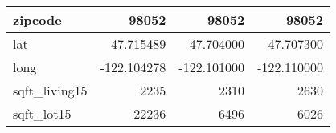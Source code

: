 \begin{table}[H]
\begin{tabular}{|l|r|r|r|}
\hline zipcode & \cellcolor[rgb]{0.9, 0.54, 0.52} 98052 & \cellcolor[rgb]{0.9, 0.54, 0.52} 98052 & \cellcolor[rgb]{0.9, 0.54, 0.52} 98052 \\
\hline lat & \cellcolor[rgb]{0.9, 0.54, 0.52} 47.715489 & 47.704000 & 47.707300 \\
\hline long & \cellcolor[rgb]{0.9, 0.54, 0.52} -122.104278 & \cellcolor[rgb]{0.9, 0.54, 0.52} -122.101000 & \cellcolor[rgb]{0.9, 0.54, 0.52} -122.110000 \\
\hline sqft\_living15 & \cellcolor[rgb]{0.9, 0.54, 0.52} 2235 & 2310 & 2630 \\
\hline sqft\_lot15 & \cellcolor[rgb]{0.9, 0.54, 0.52} 22236 & 6496 & 6026 \\
\hline
\end{tabular}
\end{table}

